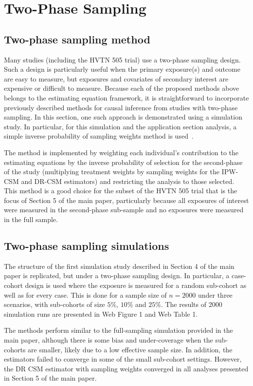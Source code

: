 \documentclass[12pt]{article}
\begin{document}
\section{Two-Phase Sampling}

\subsection{Two-phase sampling method}

Many studies (including the HVTN 505 trial) use a two-phase sampling design. Such a design is particularly useful when the primary exposure(s) and outcome are easy to measure, but exposures and covariates of secondary interest are expensive or difficult to measure. Because each of the proposed methods above belongs to the estimating equation framework, it is straightforward to incorporate previously described methods for causal inference from studies with two-phase sampling. In this section, one such approach is demonstrated using a simulation study. In particular, for this simulation and the application section analysis, a simple inverse probability of sampling weights method is used~\citep{wang2009}.

The method is implemented by weighting each individual's contribution to the estimating equations by the inverse probability of selection for the second-phase of the study (multiplying treatment weights by sampling weights for the IPW-CSM and DR-CSM estimators) and restricting the analysis to those selected. This method is a good choice for the subset of the HVTN 505 trial that is the focus of Section 5 of the main paper, particularly because all exposures of interest were measured in the second-phase sub-sample and no exposures were measured in the full sample.

\subsection{Two-phase sampling simulations}

The structure of the first simulation study described in Section 4 of the main paper is replicated, but under a two-phase sampling design. In particular, a case-cohort design is used where the exposure is measured for a random sub-cohort as well as for every case. This is done for a sample size of $n=2000$ under three scenarios, with sub-cohorts of size $5\%$, $10\%$ and $25\%$. The results of 2000 simulation runs are presented in Web Figure 1 and Web Table 1.

The methods perform similar to the full-sampling simulation provided in the main paper, although there is some bias and under-coverage when the sub-cohorts are smaller, likely due to a low effective sample size. In addition, the estimators failed to converge in some of the small sub-cohort settings. However, the DR CSM estimator with sampling weights converged in all analyses presented in Section 5 of the main paper.
\end{document}
